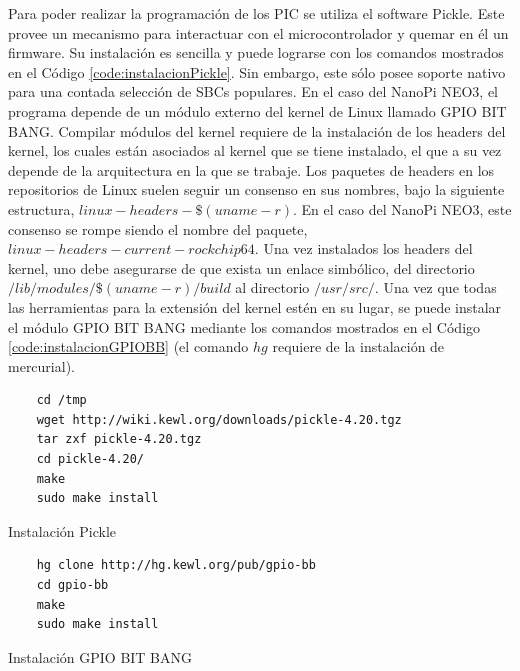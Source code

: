 \documentclass[12pt,letterpaper]{article}     %
\begin{document}
Para poder realizar la programación de los PIC se utiliza el software Pickle. 
Este provee un mecanismo para interactuar con el microcontrolador y quemar en él un firmware.
Su instalación es sencilla y puede lograrse con los comandos mostrados en el Código \ref{code:instalacionPickle}.
Sin embargo, este sólo posee soporte nativo para una contada selección de SBCs populares. En el caso del NanoPi NEO3,
el programa depende de un módulo externo del kernel de Linux llamado GPIO BIT BANG.
Compilar módulos del kernel requiere de la instalación de los headers del kernel, los cuales están asociados al kernel
que se tiene instalado, el que a su vez depende de la arquitectura en la que se trabaje. Los paquetes de headers en los
repositorios de Linux suelen seguir un consenso en sus nombres, bajo la siguiente estructura, 
$linux-headers-\$(uname -r)$. En el caso del NanoPi NEO3, este consenso se rompe siendo el nombre del paquete, 
$linux-headers-current-rockchip64$. Una vez instalados los headers del kernel, uno debe asegurarse de que exista
un enlace simbólico, del directorio $/lib/modules/\$(uname -r)/build$ al directorio $/usr/src/$.
Una vez que todas las herramientas para la extensión del kernel estén en su lugar, se puede instalar el módulo 
GPIO BIT BANG mediante los comandos mostrados en el Código \ref{code:instalacionGPIOBB} (el comando $hg$ requiere
de la instalación de mercurial).

\begin{codigo}[]
	\begin{lstlisting}
	cd /tmp
	wget http://wiki.kewl.org/downloads/pickle-4.20.tgz 
	tar zxf pickle-4.20.tgz 
	cd pickle-4.20/
	make
	sudo make install
	\end{lstlisting}
	\caption{Instalación Pickle}
	\label{code:instalacionPickle}
\end{codigo}

\begin{codigo}[!h]
	\begin{lstlisting}
	hg clone http://hg.kewl.org/pub/gpio-bb
	cd gpio-bb
	make
	sudo make install
	\end{lstlisting}
	\caption{Instalación GPIO BIT BANG}
	\label{code:instalacionGPIOBB}
\end{codigo}

\newpage
\end{document}
